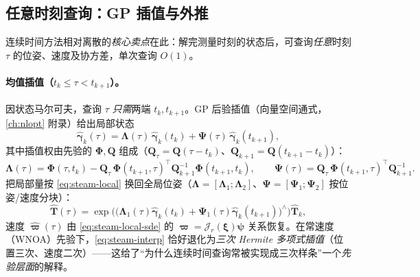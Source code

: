 \subsection{任意时刻查询：GP 插值与外推}
\label{sec:est-steam-query}

连续时间方法相对离散的\emph{核心卖点}在此：解完测量时刻的状态后，可查询\emph{任意}时刻 $\tau$ 的位姿、速度及协方差，单次查询 $O(1)$。

\paragraph{均值插值（$t_k\le\tau<t_{k+1}$）。}
因状态马尔可夫，查询 $\tau$ \emph{只需}两端 $t_k,t_{k+1}$。GP 后验插值（向量空间通式，\cref{ch:nlopt} 附录）给出局部状态
\begin{equation}
  \hat{\boldsymbol{\gamma}}_k(\tau)=\boldsymbol{\Lambda}(\tau)\,\hat{\boldsymbol{\gamma}}_k(t_k)+\boldsymbol{\Psi}(\tau)\,\hat{\boldsymbol{\gamma}}_k(t_{k+1}),
  \label{eq:steam-interp}
\end{equation}
其中插值权由先验的 $\boldsymbol{\Phi},\mathbf{Q}$ 组成（$\mathbf{Q}_\tau=\mathbf{Q}(\tau-t_k)$、$\mathbf{Q}_{k+1}=\mathbf{Q}(t_{k+1}-t_k)$）：
\begin{equation}
  \boldsymbol{\Lambda}(\tau)=\boldsymbol{\Phi}(\tau,t_k)-\mathbf{Q}_\tau\,\boldsymbol{\Phi}(t_{k+1},\tau)^\top\mathbf{Q}_{k+1}^{-1}\boldsymbol{\Phi}(t_{k+1},t_k),\qquad
  \boldsymbol{\Psi}(\tau)=\mathbf{Q}_\tau\,\boldsymbol{\Phi}(t_{k+1},\tau)^\top\mathbf{Q}_{k+1}^{-1}.
  \label{eq:steam-LambdaPsi}
\end{equation}
把局部量按 \cref{eq:steam-local} 换回全局位姿（$\boldsymbol{\Lambda}=[\boldsymbol{\Lambda}_1;\boldsymbol{\Lambda}_2]$、$\boldsymbol{\Psi}=[\boldsymbol{\Psi}_1;\boldsymbol{\Psi}_2]$ 按位姿/速度分块）：
\begin{equation}
  \hat{\mathbf{T}}(\tau)=\exp\!\Big(\big(\boldsymbol{\Lambda}_1(\tau)\hat{\boldsymbol{\gamma}}_k(t_k)+\boldsymbol{\Psi}_1(\tau)\hat{\boldsymbol{\gamma}}_k(t_{k+1})\big)^\wedge\Big)\hat{\mathbf{T}}_k,
  \label{eq:steam-Tquery}
\end{equation}
速度 $\hat{\boldsymbol{\varpi}}(\tau)$ 由 \cref{eq:steam-local-sde} 的 $\boldsymbol{\varpi}=\boldsymbol{\mathcal{J}}_r(\boldsymbol{\xi})\boldsymbol{\psi}$ 关系恢复。在常速度（WNOA）先验下，\cref{eq:steam-interp} 恰好退化为\emph{三次 Hermite 多项式插值}（位置三次、速度二次）——这给了“为什么连续时间查询常被实现成三次样条”一个\emph{先验层面}的解释。

